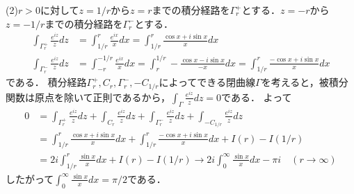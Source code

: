 \documentclass[
		book,
		head_space=20mm,
		foot_space=20mm,
		gutter=10mm,
		line_length=190mm
]{jlreq}
\begin{document}
(2)$r>0$に対して$z=1/r$から$z=r$までの積分経路を$\Gamma_r^+$とする．$z=-r$から$z=-1/r$までの積分経路を$\Gamma_r^-$とする．
\begin{align}
	\int_{\Gamma_r^+} \frac{e^{iz}}{z}dz&=\int_{1/r}^r \frac{e^{ix}}{x}dx=\int_{1/r}^r \frac{\cos x+i\sin x}{x}dx\\
	\int_{\Gamma_r^-} \frac{e^{iz}}{z}dz&=\int_{-r}^{-1/r} \frac{e^{ix}}{x}dx=\int_{r}^{1/r} -\frac{\cos x-i\sin x}{-x}dx=\int_{1/r}^r \frac{-\cos x+i\sin x}{x}dx
\end{align}である．
積分経路$\Gamma_r^+,C_r,\Gamma_r^-,-C_{1/r}$によってできる閉曲線$\Gamma$を考えると，被積分関数は原点を除いて正則であるから，$\int_{\Gamma} \frac{e^{iz}}{z}dz=0$である．
よって
\begin{align}
	0&= \int_{\Gamma_r^+} \frac{e^{iz}}{z}dz+\int_{C_r} \frac{e^{iz}}{z}dz+\int_{\Gamma_r^-} \frac{e^{iz}}{z}dz+\int_{-C_{1/r}} \frac{e^{iz}}{z}dz\\
	&=\int_{1/r}^r \frac{\cos x+i\sin x}{x}dx+\int_{1/r}^r \frac{-\cos x+i\sin x}{x}dx+I(r)-I(1/r)\\
	&=2i\int_{1/r}^r \frac{\sin x}{x}dx+I(r)-I(1/r)\rightarrow 2 i \int_{0}^\infty \frac{\sin x}{x}dx -\pi i \quad (r\rightarrow \infty)
\end{align}
したがって$\int_0^\infty \frac{\sin x}{x}dx=\pi/2$である．
\end{document}
